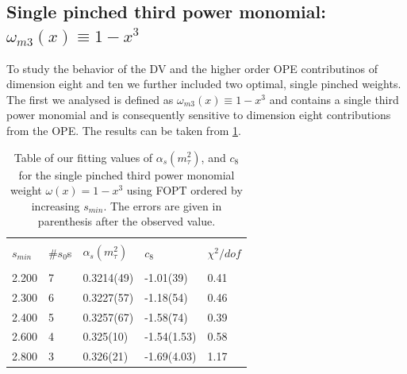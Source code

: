 \documentclass[../../index.tex]{subfiles}
\begin{document}
\subsection{Single pinched third power monomial: $\omega_{m3}(x) \equiv 1-x^3$}
To study the behavior of the \textsc{DV} and the higher order \textsc{OPE}
contributinos of dimension eight and ten we further included two optimal, single pinched weights.
The first we analysed is defined as $\omega_{m3}(x)\equiv 1-x^3$ and contains a
single third power monomial and is consequently sensitive to dimension eight
contributions from the \textsc{OPE}. The results can be taken from \cref{table:fitWM3AlD8}.
\begin{table}
  \centering
  \begin{tabular}{lllll}
    \toprule \\
    $s_{min}$ & \#$s_0$s & $\alpha_s(m_\tau^2)$ & $c_8$ &  $\chi^2/dof$  \\
    \hline \\
    2.200 & 7  & 0.3214(49) & -1.01(39) & 0.41 \\
    2.300 & 6  & 0.3227(57) & -1.18(54) & 0.46 \\
    2.400 & 5  & 0.3257(67) & -1.58(74) & 0.39 \\
    2.600 & 4  & 0.325(10) & -1.54(1.53) & 0.58 \\
    2.800 & 3  & 0.326(21) & -1.69(4.03) & 1.17 \\
    \bottomrule
  \end{tabular}
  \caption{Table of our fitting values of $\alpha_s(m_\tau^2)$, and
    $c_{8}$ for the single pinched third power monomial weight $\omega(x)=1-x^3$ using FOPT ordered
    by increasing $s_{min}$. The errors are given in parenthesis after the observed value.}
  \label{table:fitWM3AlD8}
\end{table}
\end{document}
